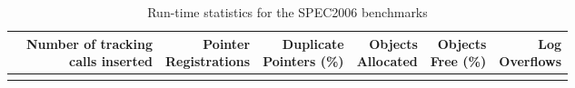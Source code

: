 \begin{table}[t]
\center
\begin{tabular}{l|*{6}{r}}
	\toprule
	\tablecell{Benchmarks} & \tablecell{Number of tracking \\ calls inserted} & \tablecell{Pointer \\ Registrations} & \tablecell{Duplicate \\ Pointers (\%)} & \tablecell{Objects \\ Allocated} & \tablecell{Objects \\ Free (\%)} & \tablecell{Log \\Overflows} \\
	\toprule
	\csvreader[head to column names]{Tables/spec_stats1.csv}{}
	{\\\benchmarks & \numinst & \ptrreg & \dupptr & \objalloc & \objfree & \logflow} \\%
	\bottomrule
\end{tabular}
\caption{Run-time statistics for the SPEC2006 benchmarks}
\label{table:spec_stats}
\end{table}

